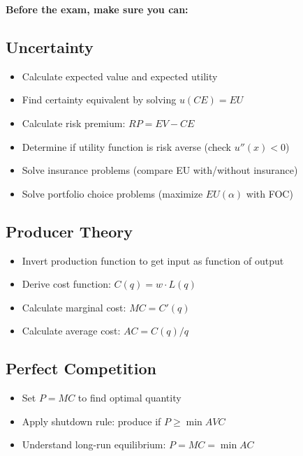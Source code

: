 \documentclass[10pt,letterpaper]{article}
\begin{document}
\begin{tcolorbox}[colback=green!10,colframe=green!70,arc=3mm]
\textbf{Before the exam, make sure you can:}

\subsection*{Uncertainty}
\begin{itemize}
  \item[$\square$] Calculate expected value and expected utility
  \item[$\square$] Find certainty equivalent by solving $u(CE) = EU$
  \item[$\square$] Calculate risk premium: $RP = EV - CE$
  \item[$\square$] Determine if utility function is risk averse (check $u''(x) < 0$)
  \item[$\square$] Solve insurance problems (compare EU with/without insurance)
  \item[$\square$] Solve portfolio choice problems (maximize $EU(\alpha)$ with FOC)
\end{itemize}

\subsection*{Producer Theory}
\begin{itemize}
  \item[$\square$] Invert production function to get input as function of output
  \item[$\square$] Derive cost function: $C(q) = w \cdot L(q)$
  \item[$\square$] Calculate marginal cost: $MC = C'(q)$
  \item[$\square$] Calculate average cost: $AC = C(q)/q$
\end{itemize}

\subsection*{Perfect Competition}
\begin{itemize}
  \item[$\square$] Set $P = MC$ to find optimal quantity
  \item[$\square$] Apply shutdown rule: produce if $P \geq \min AVC$
  \item[$\square$] Understand long-run equilibrium: $P = MC = \min AC$
\end{itemize}


\end{tcolorbox}
\end{document}

